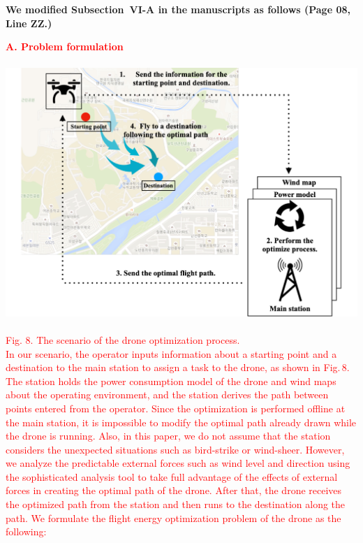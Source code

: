 \documentclass[onecolumn]{IEEEconf}
\begin{document}
\begin{description}
{	}
	~\\
    ~\\
	\textbf{We modified Subsection~VI-A in the manuscripts as follows (Page 08, Line ZZ.)}\\
    \begin{mdframed}[ linewidth=.75pt, userdefinedwidth=0.9\textwidth]
    \textbf{\justify\textcolor{red}{A. Problem formulation}}~\\
    ~\\
    \includegraphics[scale=0.34]{fig8/problem_formulation.pdf}~\\
    \textcolor{red}{Fig. 8. The scenario of the drone optimization process.}~\\
    \justify\textcolor{red}{In our scenario, the operator inputs information about a starting point and a destination to the main station to assign a task to the drone, as shown in Fig.\,8.
    The station holds the power consumption model of the drone and wind maps about the operating environment, and the station derives the path between points entered from the operator.
    Since the optimization is performed offline at the main station, it is impossible to modify the optimal path already drawn while the drone is running. Also, in this paper, we do not assume that the station considers the unexpected situations such as bird-strike or wind-sheer.
    However, we analyze the predictable external forces such as wind level and direction using the sophisticated analysis tool to take full advantage of the effects of external forces in creating the optimal path of the drone. 
    After that, the drone receives the optimized path from the station and then runs to the destination along the path. We formulate the flight energy optimization problem of the drone as the following:}


\end{mdframed}
\end{description}
\end{document}

